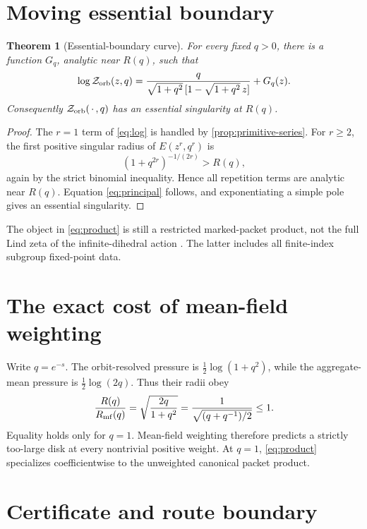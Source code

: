 \documentclass[11pt]{article}
\newtheorem{theorem}{Theorem}[section]
\newcommand{\Zorb}{\mathcal Z_{\rm orb}}
\begin{document}
\section{Moving essential boundary}

\begin{theorem}[Essential-boundary curve]\label{thm:boundary}
For every fixed $q>0$, there is a function $G_q$, analytic near $R(q)$,
such that
\begin{equation}\label{eq:principal}
 \log\Zorb(z,q)=
 \frac{q}{\sqrt{1+q^2}\,[1-\sqrt{1+q^2}\,z]}+G_q(z).
\end{equation}
Consequently \(\Zorb(\,\cdot\,,q)\) has an essential singularity at \(R(q)\).
\end{theorem}

\begin{proof}
The $r=1$ term of \eqref{eq:log} is handled by
\cref{prop:primitive-series}.  For $r\ge2$, the first positive singular
radius of $E(z^r,q^r)$ is
\[
 (1+q^{2r})^{-1/(2r)}>R(q),
\]
again by the strict binomial inequality.  Hence all repetition terms are
analytic near $R(q)$.  Equation \eqref{eq:principal} follows, and
exponentiating a simple pole gives an essential singularity.
\end{proof}

The object in \eqref{eq:product} is still a restricted marked-packet product,
not the full Lind zeta of the infinite-dihedral action
\cite{KimLeePark2003,Ryu2019}.  The latter includes all finite-index subgroup
fixed-point data.

\section{The exact cost of mean-field weighting}

Write $q=e^{-s}$.  The orbit-resolved pressure is
$\frac12\log(1+q^2)$, while the aggregate-mean pressure is
$\frac12\log(2q)$.  Thus their radii obey
\begin{equation}\label{eq:ratio}
 \frac{R(q)}{R_{\rm mf}(q)}
 =\sqrt{\frac{2q}{1+q^2}}
 =\frac1{\sqrt{(q+q^{-1})/2}}\le1.
\end{equation}
Equality holds only for $q=1$.  Mean-field weighting therefore predicts a
strictly too-large disk at every nontrivial positive weight.  At $q=1$,
\eqref{eq:product} specializes coefficientwise to the unweighted canonical
packet product.

\section{Certificate and route boundary}
\end{document}
